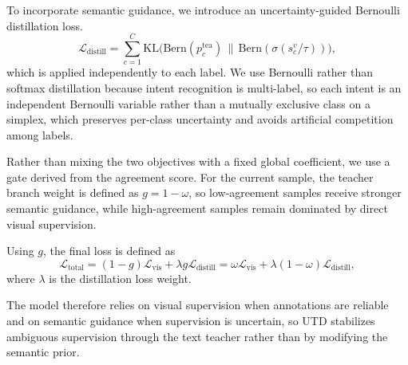 To incorporate semantic guidance, we introduce an uncertainty-guided Bernoulli distillation loss.
\begin{equation}
\mathcal{L}_{\text{distill}} = \sum_{c=1}^{C}\text{KL}\big(\mathrm{Bern}(p_c^{\text{tea}})\,\|\, \mathrm{Bern}(\sigma(s_c^{v}/\tau))\big),
\end{equation}
which is applied independently to each label. We use Bernoulli rather than softmax distillation because intent recognition is multi-label, so each intent is an independent Bernoulli variable rather than a mutually exclusive class on a simplex, which preserves per-class uncertainty and avoids artificial competition among labels.

Rather than mixing the two objectives with a fixed global coefficient, we use a gate derived from the agreement score. For the current sample, the teacher branch weight is defined as $g = 1 - \omega$, so low-agreement samples receive stronger semantic guidance, while high-agreement samples remain dominated by direct visual supervision.

Using $g$, the final loss is defined as
\begin{equation}
\mathcal{L}_{\text{total}} = (1-g)\mathcal{L}_{\text{vis}} + \lambda g \mathcal{L}_{\text{distill}}
= \omega \mathcal{L}_{\text{vis}} + \lambda (1-\omega)\mathcal{L}_{\text{distill}},
\end{equation}
where $\lambda$ is the distillation loss weight.

The model therefore relies on visual supervision when annotations are reliable and on semantic guidance when supervision is uncertain, so UTD stabilizes ambiguous supervision through the text teacher rather than by modifying the semantic prior.

\subsection{}
\label{sec:decoupling_principle}

